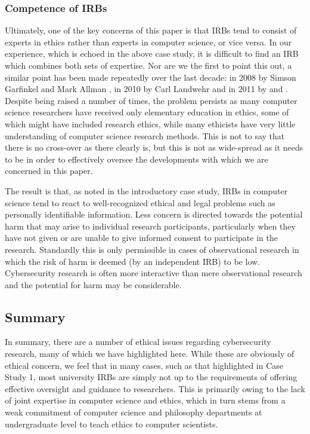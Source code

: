 \documentclass{svjour3}                     %
\begin{document}
\subsubsection{Competence of IRBs}
Ultimately, one of the key concerns of this paper is that IRBs tend to consist of experts in ethics rather than experts in computer science, or vice versa.  In our experience, which is echoed in the above case study, it is difficult to find an IRB which combines both sets of expertise. Nor are we the first to point this out, a similar point has been made repeatedly over the last decade: in 2008 by Simson Garfinkel \cite{garfinkel2008irbs} and Mark Allman \cite{allman2008ought}, in 2010 by Carl Landwehr \cite{landwehr2010drawing} and in 2011 by \cite{johnson2011computer} and \cite[p.138-39]{aycock2011human}. Despite being raised a number of times, the problem persists as many computer science researchers have received only elementary education in ethics, some of which might have included research ethics, while many ethicists have very little understanding of computer science research methods. This is not to say that there is no cross-over as there clearly is, but this is not as wide-spread as it needs to be in order to effectively oversee the developments with which we are concerned in this paper.

The result is that, as noted in the introductory case study, IRBs in computer science tend to react to well-recognized ethical and legal problems such as personally identifiable information. Less concern is directed towards the potential harm that may arise to individual research participants, particularly when they have not given or are unable to give informed consent to participate in the research. Standardly this is only permissible in cases of observational research in which the risk of harm is deemed (by an independent IRB) to be low. Cybersecurity research is often more interactive than mere observational research and the potential for harm may be considerable.

\subsection{Summary}
\label{sec:summary}
In summary, there are a number of ethical issues regarding cybersecurity research, many of which we have highlighted here.  While these are obviously of ethical concern, we feel that in many cases, such as that highlighted in Case Study 1, most university IRBs are simply not up to the requirements of offering effective oversight and guidance to researchers. This is primarily owing to the lack of joint expertise in computer science and ethics, which in turn stems from a weak commitment of computer science and philosophy departments at undergraduate level to teach ethics to computer scientists.
\end{document}
